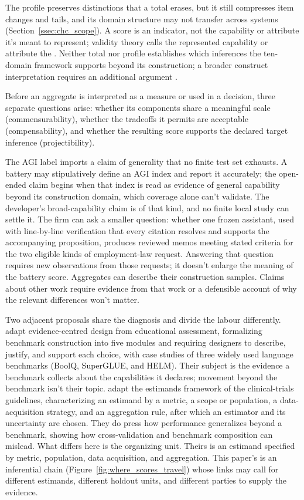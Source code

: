 \documentclass[12pt]{article}
\begin{document}
The profile preserves distinctions that a total erases, but it still compresses item changes and tails, and its domain structure may not transfer across systems (Section~\ref{ssec:chc_scope}). A score is an indicator, not the capability or attribute it's meant to represent; validity theory calls the represented capability or attribute the  \citep[742]{messick1995Validity}. Neither total nor profile establishes which inferences the ten-domain framework supports beyond its construction; a broader construct interpretation requires an additional argument \citep[24]{kane2013validating}.

Before an aggregate is interpreted as a measure or used in a decision, three separate questions arise: whether its components share a meaningful scale (commensurability), whether the tradeoffs it permits are acceptable (compensability), and whether the resulting score supports the declared target inference (projectibility).

The AGI label imports a claim of generality that no finite test set exhausts. A battery may stipulatively define an AGI index and report it accurately; the open-ended claim begins when that index is read as evidence of general capability beyond its construction domain, which coverage alone can't validate. The developer's broad-capability claim is of that kind, and no finite local study can settle it. The firm can ask a smaller question: whether one frozen assistant, used with line-by-line verification that every citation resolves and supports the accompanying proposition, produces reviewed memos meeting stated criteria for the two eligible kinds of employment-law request. Answering that question requires new observations from those requests; it doesn't enlarge the meaning of the battery score. Aggregates can describe their construction samples. Claims about other work require evidence from that work or a defensible account of why the relevant differences won't matter.

Two adjacent proposals share the diagnosis and divide the labour differently. \Textcite{liu2024ecbd} adapt evidence-centred design from educational assessment, formalizing benchmark construction into five modules and requiring designers to describe, justify, and support each choice, with case studies of three widely used language benchmarks (BoolQ, SuperGLUE, and HELM). Their subject is the evidence a benchmark collects about the capabilities it declares; movement beyond the benchmark isn't their topic. \Textcite{binetteReiter2024estimands} adapt the estimands framework of the clinical-trials guidelines, characterizing an estimand by a metric, a scope or population, a data-acquisition strategy, and an aggregation rule, after which an estimator and its uncertainty are chosen. They do press how performance generalizes beyond a benchmark, showing how cross-validation and benchmark composition can mislead. What differs here is the organizing unit. Theirs is an estimand specified by metric, population, data acquisition, and aggregation. This paper's is an inferential chain (Figure~\ref{fig:where_scores_travel}) whose links may call for different estimands, different holdout units, and different parties to supply the evidence.
\end{document}
